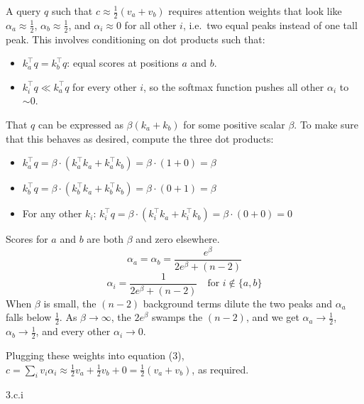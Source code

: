 \bigskip


\begin{answer}
    A query $q$ such that $c \approx \frac{1}{2}(v_a + v_b)$ requires attention weights that look like $\alpha_a \approx \frac{1}{2}$, $\alpha_b \approx \frac{1}{2}$, and $\alpha_i \approx 0$ for all other $i$, i.e.\ two equal peaks instead of one tall peak. This involves conditioning on dot products such that:
    \begin{itemize}
        \item $k_a^\top q = k_b^\top q$: equal scores at positions $a$ and $b$.
        \item $k_i^\top q \ll k_a^\top q$ for every other $i$, so the softmax function pushes all other $\alpha_i$ to ${\sim}0$.
    \end{itemize}
    That $q$ can be expressed as $\beta(k_a + k_b)$ for some positive scalar $\beta$. To make sure that this behaves as desired, compute the three dot products:
    \begin{itemize}
        \item $k_a^\top q = \beta \cdot (k_a^\top k_a + k_a^\top k_b) = \beta \cdot (1 + 0) = \beta$
        \item $k_b^\top q = \beta \cdot (k_b^\top k_a + k_b^\top k_b) = \beta \cdot (0 + 1) = \beta$
        \item For any other $k_i$: $k_i^\top q = \beta \cdot (k_i^\top k_a + k_i^\top k_b) = \beta \cdot (0 + 0) = 0$
    \end{itemize}
    Scores for $a$ and $b$ are both $\beta$ and zero elsewhere.
    \[ \alpha_a = \alpha_b = \frac{e^\beta}{2 e^\beta + (n-2)} \]
    \[ \alpha_i = \frac{1}{2 e^\beta + (n-2)} \quad \text{for } i \notin \{a, b\} \]
    When $\beta$ is small, the $(n-2)$ background terms dilute the two peaks and $\alpha_a$ falls below $\frac{1}{2}$. As $\beta \to \infty$, the $2 e^\beta$ swamps the $(n-2)$, and we get $\alpha_a \to \frac{1}{2}$, $\alpha_b \to \frac{1}{2}$, and every other $\alpha_i \to 0$.

    Plugging these weights into equation (3), $c = \sum_i v_i \alpha_i \approx \frac{1}{2} v_a + \frac{1}{2} v_b + 0 = \frac{1}{2}(v_a + v_b)$, as required.
\end{answer}


\clearpage

\LARGE
3.c.i
\normalsize

